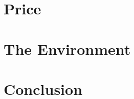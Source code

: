 \documentclass{article}
\begin{document}
  \section{Price}
  \blindtext{}\blindtext{}

  \section{The Environment}
  \blindtext{}\blindtext{}

  \section{Conclusion}
  \blindtext{}\blindtext{}


\end{document}

